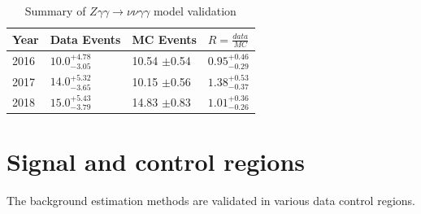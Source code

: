 \begin{table}[h]
	\centering
	\caption{Summary of $Z \gamma \gamma \rightarrow \nu \nu \gamma \gamma$ model validation}
	\begin{tabular}{|l|l|l|l|}
		\hline
		Year & Data Events & MC Events & $R = \frac{data}{MC}$ \\
		\hline
		\hline
		2016 & $10.0^{+4.78}_{-3.05}$ & 10.54 $\pm$0.54 & $0.95^{+0.46}_{-0.29}$ \\
		\hline
		2017 & $14.0^{+5.32}_{-3.65}$ & 10.15 $\pm$0.56 & $1.38^{+0.53}_{-0.37}$ \\
		\hline
		2018 & $15.0^{+5.43}_{-3.79}$ & 14.83 $\pm$0.83 & $1.01^{+0.36}_{-0.26}$ \\
		\hline
	\end{tabular}
	\label{table:ZGGtonunuGG}
\end{table}

\section{Signal and control regions}
The background estimation methods are validated in various data control regions.  

